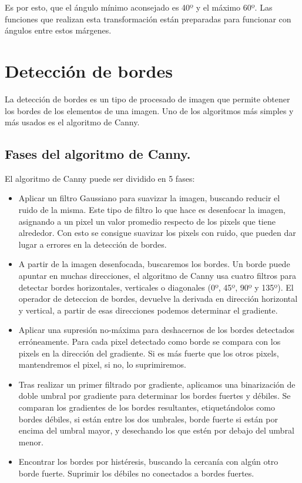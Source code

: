 Es por esto, que el ángulo mínimo aconsejado es 40º y el máximo 60º. Las funciones que realizan esta transformación están preparadas para funcionar con ángulos entre estos márgenes.


\section{Detección de bordes}
La detección de bordes es un tipo de procesado de imagen que permite obtener los bordes de los elementos de una imagen. Uno de los algoritmos más simples y más usados es el algoritmo de Canny\cite{canny_edge}. 

\subsection{Fases del algoritmo de Canny.}

El algoritmo de Canny puede ser dividido en 5 fases:
\begin{itemize}

	\item Aplicar un filtro Gaussiano para suavizar la imagen, buscando reducir el ruido de la misma. Este tipo de filtro lo que hace es desenfocar la imagen, asignando a un pixel un valor promedio respecto de los pixels que tiene alrededor. Con esto se consigue suavizar los pixels con ruido, que pueden dar lugar a errores en la detección de bordes.
	
	\item A partir de la imagen desenfocada, buscaremos los bordes. Un borde puede apuntar en muchas direcciones, el algoritmo de Canny usa cuatro filtros para detectar bordes horizontales, verticales o diagonales (0º, 45º, 90º y 135º). El operador de deteccion de bordes, devuelve la derivada en dirección horizontal y vertical, a partir de esas direcciones podemos determinar el gradiente.
	
	\item Aplicar una supresión no-máxima para deshacernos de los bordes detectados erróneamente. Para cada pixel detectado como borde se compara con los pixels en la dirección del gradiente. Si es más fuerte que los otros pixels, mantendremos el pixel, si no, lo suprimiremos.
	
	\item Tras realizar un primer filtrado por gradiente, aplicamos una binarización de doble umbral por gradiente para determinar los bordes fuertes y débiles. Se comparan los gradientes de los bordes resultantes, etiquetándolos como bordes débiles, si están entre los dos umbrales, borde fuerte si están por encima del umbral mayor, y desechando los que estén por debajo del umbral menor.
	
	\item Encontrar los bordes por histéresis, buscando  la cercanía con algún otro borde fuerte. Suprimir los débiles no conectados a bordes fuertes.
	
\end{itemize}

